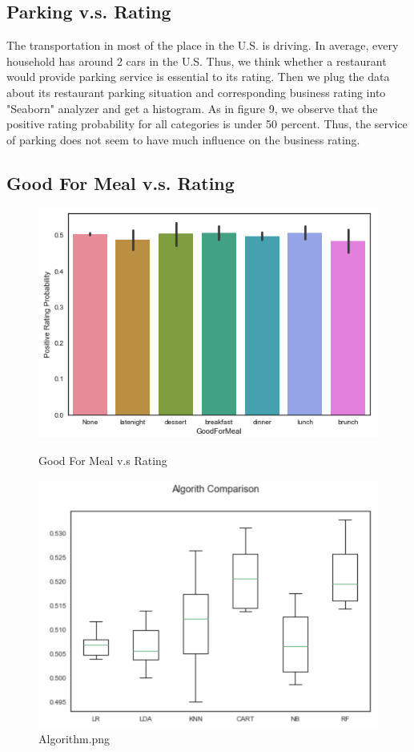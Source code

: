 \documentclass{article}
\begin{document}
\subsection{Parking v.s. Rating}

The transportation in most of the place in the U.S. is driving. In average, every household has around 2 cars in the U.S. Thus, we think whether a restaurant would provide parking service is essential to its rating. Then we plug the data about its restaurant parking situation and corresponding business rating into "Seaborn" analyzer and get a histogram. As in figure 9, we observe that the positive rating probability for all categories is under 50 percent. Thus, the service of parking does not seem to have much influence on the business rating. 

\subsection{Good For Meal v.s. Rating}
\begin{figure}[t]
\begin{minipage}{.5\textwidth}
  \centering
  \includegraphics[width=\linewidth]{GFN.png}
	\caption{Good For Meal v.s Rating}
    \end{minipage}
\begin{minipage}{.5\textwidth}
	\centering
    \includegraphics[width=\linewidth]{Algorithm.png}
    \caption{Algorithm.png}
\end{minipage}
\end{figure}
\end{document}
